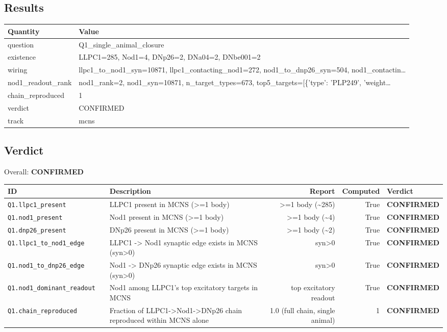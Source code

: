 \documentclass[11pt]{article}
\begin{document}
\subsection*{Results}
\begin{longtable}{@{}p{}p{}@{}}
\toprule
\textbf{Quantity} & \textbf{Value} \\
\midrule
\endhead
question & Q1\_single\_animal\_closure \\
existence & LLPC1=285, Nod1=4, DNp26=2, DNa04=2, DNbe001=2 \\
wiring & llpc1\_to\_nod1\_syn=10871, llpc1\_contacting\_nod1=272, nod1\_to\_dnp26\_syn=504, nod1\_contactin… \\
nod1\_readout\_rank & nod1\_rank=2, nod1\_syn=10871, n\_target\_types=673, top5\_targets=[\{'type': 'PLP249', 'weight… \\
chain\_reproduced & 1 \\
verdict & CONFIRMED \\
track & mcns \\
\bottomrule
\end{longtable}

\subsection*{Verdict}
\noindent Overall: \textcolor{vgreen}{\textbf{CONFIRMED}}\par\medskip
\begin{longtable}{@{}llp{}rrl@{}}
\toprule
\textbf{ID} & & \textbf{Description} & \textbf{Report} & \textbf{Computed} & \textbf{Verdict} \\
\midrule
\endhead
\texttt{Q1.llpc1\_present} & & LLPC1 present in MCNS (>=1 body) & >=1 body (\textasciitilde{}285) & True & \textcolor{vgreen}{\textbf{CONFIRMED}} \\
\texttt{Q1.nod1\_present} & & Nod1 present in MCNS (>=1 body) & >=1 body (\textasciitilde{}4) & True & \textcolor{vgreen}{\textbf{CONFIRMED}} \\
\texttt{Q1.dnp26\_present} & & DNp26 present in MCNS (>=1 body) & >=1 body (\textasciitilde{}2) & True & \textcolor{vgreen}{\textbf{CONFIRMED}} \\
\texttt{Q1.llpc1\_to\_nod1\_edge} & & LLPC1 -> Nod1 synaptic edge exists in MCNS (syn>0) & syn>0 & True & \textcolor{vgreen}{\textbf{CONFIRMED}} \\
\texttt{Q1.nod1\_to\_dnp26\_edge} & & Nod1 -> DNp26 synaptic edge exists in MCNS (syn>0) & syn>0 & True & \textcolor{vgreen}{\textbf{CONFIRMED}} \\
\texttt{Q1.nod1\_dominant\_readout} & & Nod1 among LLPC1's top excitatory targets in MCNS & top excitatory readout & True & \textcolor{vgreen}{\textbf{CONFIRMED}} \\
\texttt{Q1.chain\_reproduced} & & Fraction of LLPC1->Nod1->DNp26 chain reproduced within MCNS alone & 1.0 (full chain, single animal) & 1 & \textcolor{vgreen}{\textbf{CONFIRMED}} \\
\bottomrule
\end{longtable}
\end{document}
